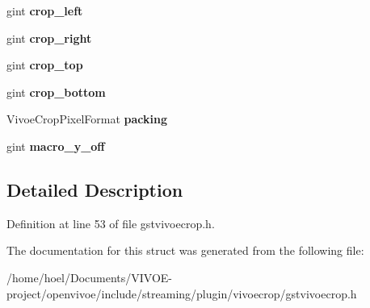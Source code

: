\begin{DoxyCompactItemize}
\item 
gint {\bfseries crop\+\_\+left}\hypertarget{struct__GstVivoeCrop_a7e0c6c0ed333affa8942002b92a4a8db}{}\label{struct__GstVivoeCrop_a7e0c6c0ed333affa8942002b92a4a8db}

\item 
gint {\bfseries crop\+\_\+right}\hypertarget{struct__GstVivoeCrop_aa184a334f599de7f2eafb0513088e24f}{}\label{struct__GstVivoeCrop_aa184a334f599de7f2eafb0513088e24f}

\item 
gint {\bfseries crop\+\_\+top}\hypertarget{struct__GstVivoeCrop_a2daa598b2995178c18e3c233d8f1caa2}{}\label{struct__GstVivoeCrop_a2daa598b2995178c18e3c233d8f1caa2}

\item 
gint {\bfseries crop\+\_\+bottom}\hypertarget{struct__GstVivoeCrop_a6a12e54be5d2a471c73026d9cbb28acb}{}\label{struct__GstVivoeCrop_a6a12e54be5d2a471c73026d9cbb28acb}

\item 
Vivoe\+Crop\+Pixel\+Format {\bfseries packing}\hypertarget{struct__GstVivoeCrop_a40daf0b49df5c130d3d888859d794e69}{}\label{struct__GstVivoeCrop_a40daf0b49df5c130d3d888859d794e69}

\item 
gint {\bfseries macro\+\_\+y\+\_\+off}\hypertarget{struct__GstVivoeCrop_a8d33ed90076f4f51d3265bac8eacc3e3}{}\label{struct__GstVivoeCrop_a8d33ed90076f4f51d3265bac8eacc3e3}

\end{DoxyCompactItemize}


\subsection{Detailed Description}


Definition at line 53 of file gstvivoecrop.\+h.



The documentation for this struct was generated from the following file\+:\begin{DoxyCompactItemize}
\item 
/home/hoel/\+Documents/\+V\+I\+V\+O\+E-\/project/openvivoe/include/streaming/plugin/vivoecrop/gstvivoecrop.\+h\end{DoxyCompactItemize}
